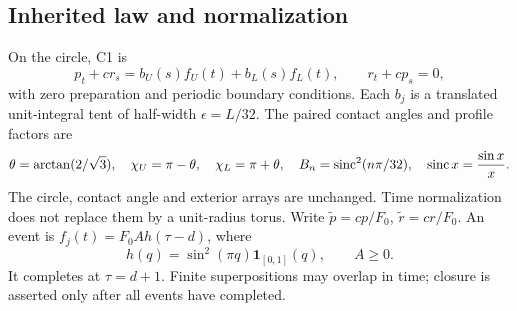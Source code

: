 \subsection{Inherited law and normalization}
On the circle, C1 is
\begin{equation}\label{eq:C1}
 p_t+c r_s=b_U(s)f_U(t)+b_L(s)f_L(t),\qquad r_t+c p_s=0,
\end{equation}
with zero preparation and periodic boundary conditions. Each $b_j$ is a translated unit-integral tent of half-width $\epsilon=L/32$. The paired contact angles and profile factors are
\begin{equation}\label{eq:geometry}
 \theta=\arctan(2/\sqrt3),\quad
 \chi_U=\pi-\theta,\quad\chi_L=\pi+\theta,\quad
 B_n=\operatorname{sinc}^2(n\pi/32),\quad \operatorname{sinc} x=\frac{\sin x}{x}.
\end{equation}
The circle, contact angle and exterior arrays are unchanged. Time normalization does not replace them by a unit-radius torus. Write $\widetilde p=cp/F_0$, $\widetilde r=cr/F_0$. An event is $f_j(t)=F_0 A h(\tau-d)$, where
\[
 h(q)=\sin^2(\pi q)\mathbf1_{[0,1]}(q),\qquad A\ge0 .
\]
It completes at $\tau=d+1$. Finite superpositions may overlap in time; closure is asserted only after all events have completed.

